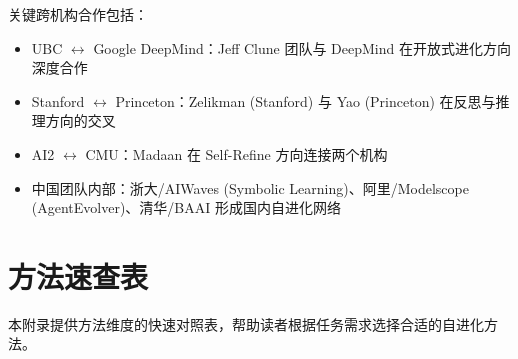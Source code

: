 关键跨机构合作包括：
\begin{itemize}
\item UBC $\leftrightarrow$ Google DeepMind：Jeff Clune 团队与 DeepMind 在开放式进化方向深度合作
\item Stanford $\leftrightarrow$ Princeton：Zelikman (Stanford) 与 Yao (Princeton) 在反思与推理方向的交叉
\item AI2 $\leftrightarrow$ CMU：Madaan 在 Self-Refine 方向连接两个机构
\item 中国团队内部：浙大/AIWaves (Symbolic Learning)、阿里/Modelscope (AgentEvolver)、清华/BAAI 形成国内自进化网络
\end{itemize}

\section{方法速查表}\label{app:method-lookup}

本附录提供方法维度的快速对照表，帮助读者根据任务需求选择合适的自进化方法。

